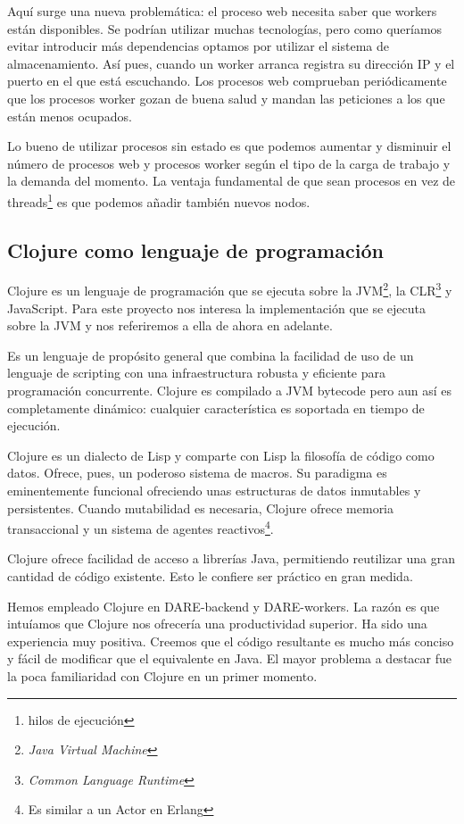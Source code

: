 Aquí surge una nueva problemática: el proceso web necesita saber que
workers están disponibles. Se podrían utilizar muchas tecnologías,
pero como queríamos evitar introducir más dependencias optamos por
utilizar el sistema de almacenamiento. Así pues, cuando un worker
arranca registra su dirección IP y el puerto en el que está
escuchando. Los procesos web comprueban periódicamente que los
procesos worker gozan de buena salud y mandan las peticiones a los que
están menos ocupados.

Lo bueno de utilizar procesos sin estado es que podemos aumentar y
disminuir el número de procesos web y procesos worker según el tipo de
la carga de trabajo y la demanda del momento. La ventaja fundamental
de que sean procesos en vez de threads\footnote{hilos de ejecución} es
que podemos añadir también nuevos nodos.

\subsection{Clojure como lenguaje de programación}

Clojure es un lenguaje de programación que se ejecuta sobre la
JVM\footnote{\emph{Java Virtual Machine}}, la
CLR\cite{CLR}\footnote{\emph{Common Language Runtime}} y
JavaScript. Para este proyecto nos interesa la implementación que se
ejecuta sobre la JVM y nos referiremos a ella de ahora en adelante.

Es un lenguaje de propósito general que combina la facilidad de uso de
un lenguaje de scripting con una infraestructura robusta y eficiente
para programación concurrente. Clojure es compilado a JVM bytecode
pero aun así es completamente dinámico: cualquier característica es
soportada en tiempo de ejecución.

Clojure es un dialecto de Lisp\cite{LISP} y comparte con Lisp la
filosofía de código como datos. Ofrece, pues, un poderoso sistema de
macros. Su paradigma es eminentemente funcional ofreciendo unas
estructuras de datos inmutables y
persistentes\cite{PERSISTENT-DATA-STRUCTURES}. Cuando mutabilidad es
necesaria, Clojure ofrece memoria transaccional y un sistema de
agentes reactivos\footnote{Es similar a un Actor en Erlang}.

Clojure ofrece facilidad de acceso a librerías Java, permitiendo
reutilizar una gran cantidad de código existente. Esto le confiere ser
práctico en gran medida.

Hemos empleado Clojure en DARE-backend y DARE-workers. La razón es que
intuíamos que Clojure nos ofrecería una productividad superior. Ha
sido una experiencia muy positiva. Creemos que el código resultante es
mucho más conciso y fácil de modificar que el equivalente en Java. El
mayor problema a destacar fue la poca familiaridad con Clojure en un
primer momento.


